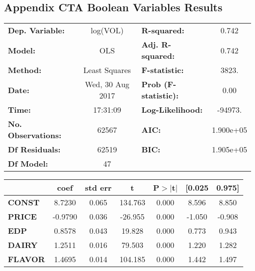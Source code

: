 \documentclass{article}
\begin{document}
\subsection{Appendix CTA Boolean Variables Results}

\begin{center}
\begin{tabular}{lclc}
\toprule
\textbf{Dep. Variable:}    &        log(VOL)         & \textbf{  R-squared:         } &     0.742   \\
\textbf{Model:}            &       OLS        & \textbf{  Adj. R-squared:    } &     0.742   \\
\textbf{Method:}           &  Least Squares   & \textbf{  F-statistic:       } &     3823.   \\
\textbf{Date:}             & Wed, 30 Aug 2017 & \textbf{  Prob (F-statistic):} &     0.00    \\
\textbf{Time:}             &     17:31:09     & \textbf{  Log-Likelihood:    } &   -94973.   \\
\textbf{No. Observations:} &       62567      & \textbf{  AIC:               } & 1.900e+05   \\
\textbf{Df Residuals:}     &       62519      & \textbf{  BIC:               } & 1.905e+05   \\
\textbf{Df Model:}         &          47      & \textbf{                     } &             \\
\bottomrule
\end{tabular}
\begin{tabular}{lcccccc}
               & \textbf{coef} & \textbf{std err} & \textbf{t} & \textbf{P$>$$|$t$|$} & \textbf{[0.025} & \textbf{0.975]}  \\
\midrule
\textbf{CONST} &       8.7230  &        0.065     &   134.763  &         0.000        &        8.596    &        8.850     \\
\textbf{PRICE}    &      -0.9790  &        0.036     &   -26.955  &         0.000        &       -1.050    &       -0.908     \\
\textbf{EDP}    &       0.8578  &        0.043     &    19.828  &         0.000        &        0.773    &        0.943     \\
\textbf{DAIRY}    &       1.2511  &        0.016     &    79.503  &         0.000        &        1.220    &        1.282     \\
\textbf{FLAVOR}    &       1.4695  &        0.014     &   104.185  &         0.000        &        1.442    &        1.497     \\

\end{tabular}
\end{center}
\end{document}
